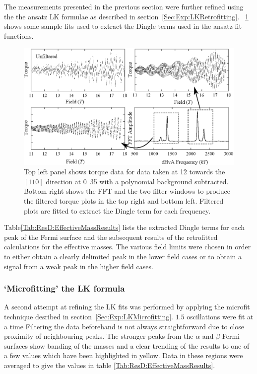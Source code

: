 The measurements presented in the previous section were further refined using the the ansatz \ac{LK} formulae as described in section~\ref{Sec:Exp:LKRetrofitting}. \Fig~\ref{Fig:ResD:DingleTermExtractionFits} shows some sample fits used to extract the Dingle terms used in the ansatz fit functions.
\begin{figure}[htbp]
    \begin{center}
        \includegraphics[scale=0.9]{Chapter-dHvABaFe2P2/Figures/Mass/FittingDingleTerm/FittingDingleTerm}
        \caption{Top left panel shows torque data for data taken at \unit{12}{\degree} towards the $[110]$ direction at \unit{0.35}{\tesla} with a polynomial background subtracted. Bottom right shows the \ac{FFT} and the two filter windows to produce the filtered torque plots in the top right and bottom left. Filtered plots are fitted to extract the Dingle term for each frequency.}
        \label{Fig:ResD:DingleTermExtractionFits}
    \end{center}
\end{figure}
Table\ref{Tab:ResD:EffectiveMassResults} lists the extracted Dingle terms for each peak of the Fermi surface and the subsequent results of the retrofitted calculations for the effective masses. The various field limits were chosen in order to either obtain a clearly delimited peak in the lower field cases or to obtain a signal from a weak peak in the higher field cases.


\subsubsection{`Microfitting' the \ac{LK} formula}

A second attempt at refining the \ac{LK} fits was performed by applying the microfit technique desribed in section~\ref{Sec:Exp:LKMicrofitting}. $1.5$ oscillations were fit at a time Filtering the data beforehand is not always straightforward due to close proximity of neighbouring peaks. The stronger peaks from the $\alpha$ and $\beta$ Fermi surfaces show banding of the masses and a clear trending of the results to one of a few values which have been highlighted in yellow. Data in these regions were averaged to give the values in table \ref{Tab:ResD:EffectiveMassResults}.

